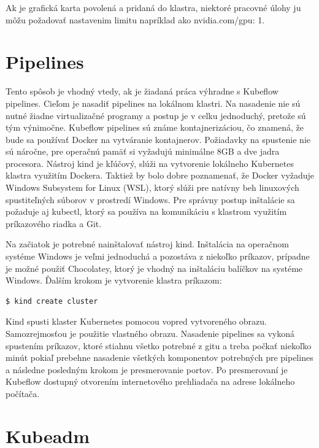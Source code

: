 Ak je grafická karta povolená a pridaná do klastra, niektoré pracovné úlohy ju môžu požadovať nastavenim limitu napríklad ako nvidia.com/gpu: 1.

\section{Pipelines}

Tento spôsob je vhodný vtedy, ak je žiadaná práca výhradne s Kubeflow pipelines. Cieľom je nasadiť pipelines na lokálnom klastri. Na nasadenie nie sú nutné žiadne virtualizačné programy a postup je v celku jednoduchý, pretože sú tým výnimočne. Kubeflow pipelines sú známe kontajnerizáciou, čo znamená, že bude sa používať Docker na vytváranie kontajnerov. Požiadavky na spustenie nie sú náročne, pre operačnú pamäť si vyžadujú minimálne 8GB a dve jadra procesora. Nástroj kind je kľúčový, slúži na vytvorenie lokálneho Kubernetes klastra využitím Dockera. Taktiež by bolo dobre poznamenať, že Docker vyžaduje Windows Subsystem for Linux (WSL), ktorý slúži pre natívny beh linuxových spustiteľných súborov v prostredí Windows. Pre správny postup inštalácie sa požaduje aj kubectl, ktorý sa používa na komunikáciu s klastrom využitím príkazového riadka a Git.

Na začiatok je potrebné nainštalovať nástroj kind. Inštalácia na operačnom systéme Windows je veľmi jednoduchá a pozostáva z niekoľko príkazov, prípadne je možné použiť Chocolatey, ktorý je vhodný na inštaláciu balíčkov na systéme Windows. Ďalším krokom je vytvorenie klastra príkazom:

\begin{lstlisting}[language=Bash]
    $ kind create cluster
    \end{lstlisting}

Kind spusti klaster Kubernetes pomocou vopred vytvoreného obrazu. Samozrejmosťou je použitie vlastného obrazu. Nasadenie pipelines sa vykoná spustením príkazov, ktoré stiahnu všetko potrebné z gitu a treba počkať niekoľko minút pokiaľ prebehne nasadenie všetkých komponentov potrebných pre pipelines a následne posledným krokom je presmerovanie portov. Po presmerovaní je Kubeflow dostupný otvorením internetového prehliadača na adrese lokálneho počítača.

\section{Kubeadm}

